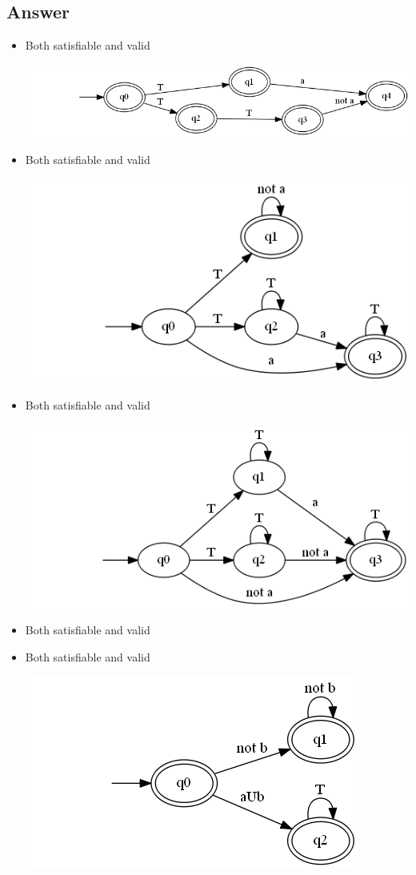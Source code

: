 \documentclass[12pt]{article}
\begin{document}
\subsection*{Answer}
\begin{itemize}
	\item Both satisfiable and valid
	\begin{center}
		\includegraphics*[scale=0.5]{ex525a.png}
	\end{center}
	\item Both satisfiable and valid
	\begin{center}
		\includegraphics*[scale=0.5]{ex525b.png}
	\end{center}
	\item Both satisfiable and valid
	\begin{center}
		\includegraphics*[scale=0.5]{ex525c.png}
	\end{center}
	\item Both satisfiable and valid
	\item Both satisfiable and valid
	\begin{center}
		\includegraphics*[scale=0.5]{ex525e.png}
	\end{center}
\end{itemize}
\end{document}

